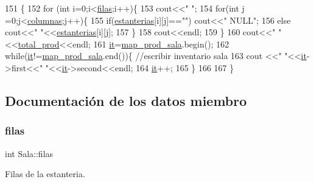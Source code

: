 \begin{DoxyCode}
151 \{
152     \textcolor{keywordflow}{for} (\textcolor{keywordtype}{int} i=0;i<\hyperlink{class_sala_a4cccb03763eea3ebd6d192491b25f7dc}{filas};i++)\{
153         cout<<\textcolor{stringliteral}{" "};
154         \textcolor{keywordflow}{for}(\textcolor{keywordtype}{int} j =0;j<\hyperlink{class_sala_af3c278931f26e28e77fa363e9be82000}{columnas};j++)\{
155             \textcolor{keywordflow}{if}(\hyperlink{class_sala_a88aae17b7e590770fe8115b41da2e26a}{estanterias}[i][j]==\textcolor{stringliteral}{""}) cout<<\textcolor{stringliteral}{" NULL"};
156             \textcolor{keywordflow}{else} cout<<\textcolor{stringliteral}{" "}<<\hyperlink{class_sala_a88aae17b7e590770fe8115b41da2e26a}{estanterias}[i][j];
157         \}
158         cout<<endl;
159     \}
160     cout<<\textcolor{stringliteral}{"  "}<<\hyperlink{class_sala_aeb64df257f47ad63fe1ba3b163255e14}{total\_prod}<<endl;
161     \hyperlink{class_sala_a1cc789ab041a9e3011f9eec9357e8fb0}{it}=\hyperlink{class_sala_a1ee09851cf1735dc48ab69a91952e250}{map\_prod\_sala}.begin();
162     \textcolor{keywordflow}{while}(\hyperlink{class_sala_a1cc789ab041a9e3011f9eec9357e8fb0}{it}!=\hyperlink{class_sala_a1ee09851cf1735dc48ab69a91952e250}{map\_prod\_sala}.end())\{  \textcolor{comment}{//escribir inventario sala}
163         cout <<\textcolor{stringliteral}{"  "}<<\hyperlink{class_sala_a1cc789ab041a9e3011f9eec9357e8fb0}{it}->first<<\textcolor{stringliteral}{" "}<<\hyperlink{class_sala_a1cc789ab041a9e3011f9eec9357e8fb0}{it}->second<<endl;
164         \hyperlink{class_sala_a1cc789ab041a9e3011f9eec9357e8fb0}{it}++;
165     \}
166 
167 \}
\end{DoxyCode}


\subsection{Documentación de los datos miembro}
\mbox{\label{class_sala_a4cccb03763eea3ebd6d192491b25f7dc}} 
\subsubsection{\texorpdfstring{filas}{filas}}
{\footnotesize\ttfamily int Sala\+::filas\hspace{0.3cm}{\ttfamily [private]}}



Filas de la estanteria. 



